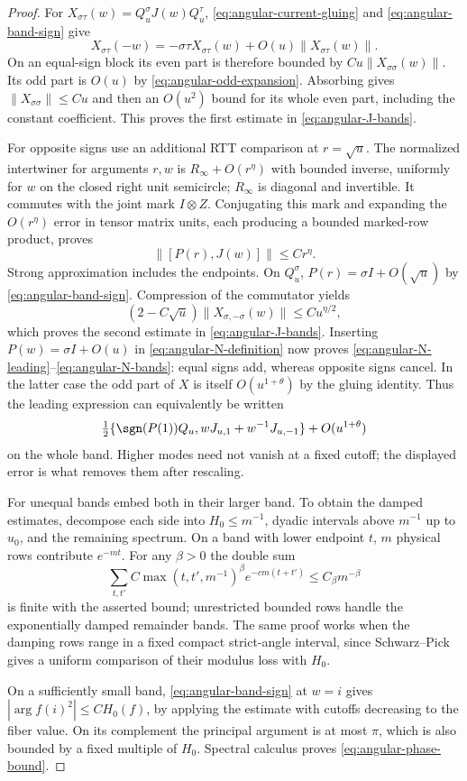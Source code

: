 \begin{proof}
For $X_{\sigma\tau}(w)=Q_u^\sigma J(w)Q_u^\tau$,
\eqref{eq:angular-current-gluing} and
\eqref{eq:angular-band-sign} give
\[
 X_{\sigma\tau}(-w)=-\sigma\tau X_{\sigma\tau}(w)
                 +O(u)\|X_{\sigma\tau}(w)\|.
\]
On an equal-sign block its even part is therefore bounded by
$Cu\|X_{\sigma\sigma}(w)\|$.  Its odd part is $O(u)$ by
\eqref{eq:angular-odd-expansion}.  Absorbing gives
$\|X_{\sigma\sigma}\|\le Cu$ and then an $O(u^2)$ bound for its
whole even part, including the constant coefficient.  This proves the
first estimate in \eqref{eq:angular-J-bands}.

For opposite signs use an additional RTT comparison at $r=\sqrt u$.
The normalized intertwiner for arguments $r,w$ is
$R_\infty+O(r^\eta)$ with bounded inverse, uniformly for $w$ on the
closed right unit semicircle; $R_\infty$ is diagonal and invertible.
It commutes with the joint mark $I\otimes Z$.  Conjugating this mark
and expanding the $O(r^\eta)$ error in tensor matrix units, each
producing a bounded marked-row product, proves
\[
 \|[P(r),J(w)]\|\le Cr^\eta.
\]
Strong approximation includes the endpoints.  On $Q_u^\sigma$,
$P(r)=\sigma I+O(\sqrt u)$ by
\eqref{eq:angular-band-sign}.  Compression of the commutator yields
\[
 (2-C\sqrt u)\|X_{\sigma,-\sigma}(w)\|
 \le Cu^{\eta/2},
\]
which proves the second estimate in
\eqref{eq:angular-J-bands}.  Inserting
$P(w)=\sigma I+O(u)$ in \eqref{eq:angular-N-definition} now proves
\eqref{eq:angular-N-leading}--\eqref{eq:angular-N-bands}: equal signs
add, whereas opposite signs cancel.  In the latter case the odd part
of $X$ is itself $O(u^{1+\theta})$ by the gluing identity.  Thus the
leading expression can equivalently be written
\[
 \tfrac12\{\sgn(P(1))Q_u, wJ_{u,1}+w^{-1}J_{u,-1}\}
       +O(u^{1+\theta})
\]
on the whole band.  Higher modes need not vanish at a fixed cutoff;
the displayed error is what removes them after rescaling.

For unequal bands embed both in their larger band.  To obtain the
damped estimates, decompose each side into $H_0\le m^{-1}$, dyadic
intervals above $m^{-1}$ up to $u_0$, and the remaining spectrum.
On a band with lower endpoint $t$, $m$ physical rows contribute
$e^{-mt}$.  For any $\beta>0$ the double sum
\[
 \sum_{t,t'} C\max(t,t',m^{-1})^\beta e^{-cm(t+t')}
 \le C_\beta m^{-\beta}
\]
is finite with the asserted bound; unrestricted bounded rows handle
the exponentially damped remainder bands.  The same proof works when
the damping rows range in a fixed compact strict-angle interval, since
Schwarz--Pick gives a uniform comparison of their modulus loss with
$H_0$.

On a sufficiently small band, \eqref{eq:angular-band-sign} at $w=i$
gives $|\arg f(i)^2|\le C H_0(f)$, by applying the estimate with
cutoffs decreasing to the fiber value.  On its complement the principal
argument is at most $\pi$, which is also bounded by a fixed multiple
of $H_0$.  Spectral calculus proves
\eqref{eq:angular-phase-bound}.
\end{proof}

